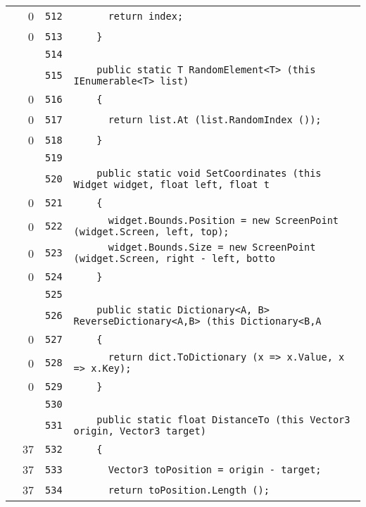 \documentclass[a4paper,10pt]{article}
\begin{document}
\begin{longtable}[l]{lrrl}
\cellcolor{red} & 0 & \verb~512~ & \verb~      return index;~\\
\cellcolor{red} & 0 & \verb~513~ & \verb~    }~\\
\cellcolor{gray} &  & \verb~514~ & \verb~~\\
\cellcolor{gray} &  & \verb~515~ & \verb~    public static T RandomElement<T> (this IEnumerable<T> list)~\\
\cellcolor{red} & 0 & \verb~516~ & \verb~    {~\\
\cellcolor{red} & 0 & \verb~517~ & \verb~      return list.At (list.RandomIndex ());~\\
\cellcolor{red} & 0 & \verb~518~ & \verb~    }~\\
\cellcolor{gray} &  & \verb~519~ & \verb~~\\
\cellcolor{gray} &  & \verb~520~ & \verb~    public static void SetCoordinates (this Widget widget, float left, float t~\\
\cellcolor{red} & 0 & \verb~521~ & \verb~    {~\\
\cellcolor{red} & 0 & \verb~522~ & \verb~      widget.Bounds.Position = new ScreenPoint (widget.Screen, left, top);~\\
\cellcolor{red} & 0 & \verb~523~ & \verb~      widget.Bounds.Size = new ScreenPoint (widget.Screen, right - left, botto~\\
\cellcolor{red} & 0 & \verb~524~ & \verb~    }~\\
\cellcolor{gray} &  & \verb~525~ & \verb~~\\
\cellcolor{gray} &  & \verb~526~ & \verb~    public static Dictionary<A, B> ReverseDictionary<A,B> (this Dictionary<B,A~\\
\cellcolor{red} & 0 & \verb~527~ & \verb~    {~\\
\cellcolor{red} & 0 & \verb~528~ & \verb~      return dict.ToDictionary (x => x.Value, x => x.Key);~\\
\cellcolor{red} & 0 & \verb~529~ & \verb~    }~\\
\cellcolor{gray} &  & \verb~530~ & \verb~~\\
\cellcolor{gray} &  & \verb~531~ & \verb~    public static float DistanceTo (this Vector3 origin, Vector3 target)~\\
\cellcolor{green} & 37 & \verb~532~ & \verb~    {~\\
\cellcolor{green} & 37 & \verb~533~ & \verb~      Vector3 toPosition = origin - target;~\\
\cellcolor{green} & 37 & \verb~534~ & \verb~      return toPosition.Length ();~\\

\end{longtable}
\end{document}
